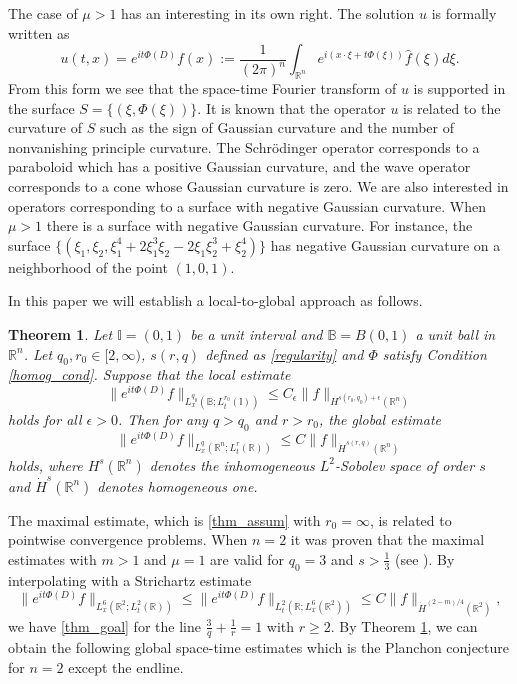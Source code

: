 \documentclass[11pt,reqno]{amsart}
\theoremstyle{plain}
\newtheorem{thm}{Theorem}[section]
\theoremstyle{definition}
\theoremstyle{remark}
\numberwithin{equation}{section}
\begin{document}
The case of $\mu > 1$ has an interesting in its own right. The solution $u$ is formally written as
    \begin{equation*}
    u(t,x) = e^{it\Phi(D)}f(x) :=  \frac{1}{(2\pi)^n}\int_{\mathbb R^n} e^{i(x \cdot \xi + t \Phi(\xi))} \hat f(\xi) d\xi.
    \end{equation*}
From this form  we see that the space-time Fourier transform of $u$ is supported in the surface $S=\{(\xi, \Phi(\xi))\}$. It is known that the operator $u$ is related to the curvature of $S$ such as the sign of Gaussian curvature and the number of nonvanishing principle curvature. The Schr\"odinger operator corresponds to a paraboloid which has a positive Gaussian curvature, and the wave operator corresponds to a cone whose Gaussian curvature is zero. We are also interested in operators corresponding to a surface with negative Gaussian curvature. When $\mu >1$ there is a surface with negative Gaussian curvature. For instance, the surface $\{(\xi_1,\xi_2,\xi_1^4+2\xi_1^3\xi_2 - 2\xi_1\xi_2^3 +\xi_2^4) \}$ has negative Gaussian curvature on a neighborhood of the point $(1,0,1)$. 

In this paper we will establish a local-to-global approach as follows.

\begin{thm}\label{main_thm2}
Let $\mathbb I = (0,1)$ be a unit interval and $\mathbb B = B(0,1)$ a unit ball in $\mathbb R^n$.
Let $q_0, r_0 \in [2,\infty)$, $s(r,q)$ defined as \eqref{regularity} and $\Phi$ satisfy Condition \ref{homog_cond}.
Suppose that the local estimate
	\begin{equation}\label{thm_assum}
	\|e^{it\Phi(D)} f \|_{L_x^{q_0}(\mathbb{B};L_t^{r_0}(\mathbb{I}))}
	\leq C_{\epsilon} \|f\|_{H^{s(r_0,q_0)+\epsilon}(\mathbb{R}^n)}
	\end{equation}
holds for all $\epsilon>0$.
Then for any $q> q_0$ and $r> r_0$, the global estimate
	\begin{equation}\label{thm_goal}
	\|e^{it\Phi(D)} f \|_{L_x^q(\mathbb R^n;L_t^r(\mathbb R))}
	\le C \|f\|_{\dot H^{s(r,q)}(\mathbb R^n)}
	\end{equation}
holds, where $H^s(\mathbb R^n)$ denotes the inhomogeneous $L^2$-Sobolev space of order $s$ and $\dot H^s(\mathbb R^n)$ denotes homogeneous one.
\end{thm}

The maximal estimate, which is \eqref{thm_assum} with $r_0=\infty$, is related to pointwise convergence problems.
%
When $n=2$ it was proven that the maximal estimates with $m>1$ and $\mu=1$ are valid for $q_0=3$ and $s>\frac{1}{3}$ (see \cites{CK, DGL}). By interpolating with a Strichartz estimate
	\begin{equation*}
	\|e^{it\Phi(D)} f \|_{L_x^6(\mathbb{R}^2;L_t^2(\mathbb{R}))}
    \le \|e^{it\Phi(D)} f \|_{L_t^2(\mathbb{R};L_x^6(\mathbb{R}^2))}
	\leq C\|f\|_{\dot{H}^{(2-m)/4}(\mathbb{R}^2)},
	\end{equation*}
we have \eqref{thm_goal} for the line $\frac{3}{q} + \frac{1}{r} = 1$ with $r \ge 2$.
By Theorem \ref{main_thm2}, we can obtain the following global space-time estimates which is the Planchon conjecture  for $n=2$ except the endline.
\end{document}
